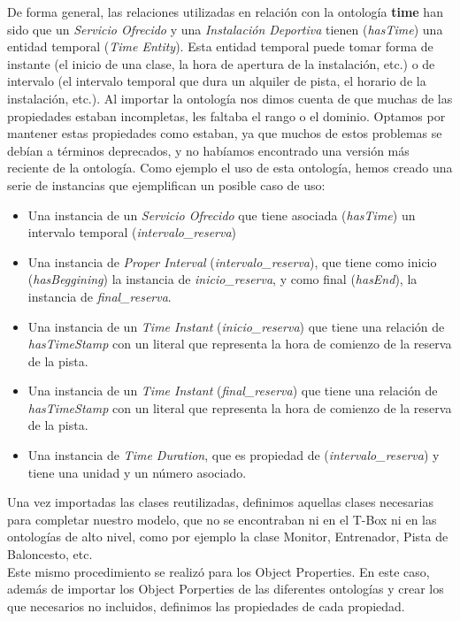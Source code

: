 \documentclass[a4paper,12pt]{article}
\begin{document}
	De forma general, las relaciones utilizadas en relación con la ontología \textbf{time} han sido que un \textit{Servicio Ofrecido} y una \textit{Instalación Deportiva} tienen (\textit{hasTime}) una entidad temporal (\textit{Time Entity}). Esta entidad temporal puede tomar forma de instante (el inicio de una clase, la hora de apertura de la instalación, etc.) o de intervalo (el intervalo temporal que dura un alquiler de pista, el horario de la instalación, etc.). Al importar la ontología nos dimos cuenta de que muchas de las propiedades estaban incompletas, les faltaba el rango o el dominio. Optamos por mantener estas propiedades como estaban, ya que muchos de estos problemas se debían a términos deprecados, y no habíamos encontrado una versión más reciente de la ontología. Como ejemplo el uso de esta ontología, hemos creado una serie de instancias que ejemplifican un posible caso de uso:
	\begin{itemize}
	    \item Una instancia de un \textit{Servicio Ofrecido} que tiene asociada (\textit{hasTime}) un intervalo temporal (\textit{intervalo\_reserva})
	    \item Una instancia de \textit{Proper Interval} (\textit{intervalo\_reserva}), que tiene como inicio (\textit{hasBeggining}) la instancia de \textit{inicio\_reserva}, y como final (\textit{hasEnd}), la instancia de \textit{final\_reserva}.
	    \item Una instancia de un \textit{Time Instant} (\textit{inicio\_reserva}) que tiene una relación de \textit{hasTimeStamp} con un literal que representa la hora de comienzo de la reserva de la pista.
	    \item Una instancia de un \textit{Time Instant} (\textit{final\_reserva}) que tiene una relación de \textit{hasTimeStamp} con un literal que representa la hora de comienzo de la reserva de la pista.
	    \item Una instancia de \textit{Time Duration}, que es propiedad de (\textit{intervalo\_reserva}) y tiene una unidad y un número asociado. 
	\end{itemize}
	
	Una vez importadas las clases reutilizadas, definimos aquellas clases necesarias para completar nuestro modelo, que no se encontraban ni en el T-Box ni en las ontologías de alto nivel, como por ejemplo la clase Monitor, Entrenador, Pista de Baloncesto, etc.\\
		
	Este mismo procedimiento se realizó para los Object Properties. En este caso, además de importar los Object Porperties de las diferentes ontologías y crear los que necesarios no incluidos, definimos las propiedades de cada propiedad.
		
\end{document}
